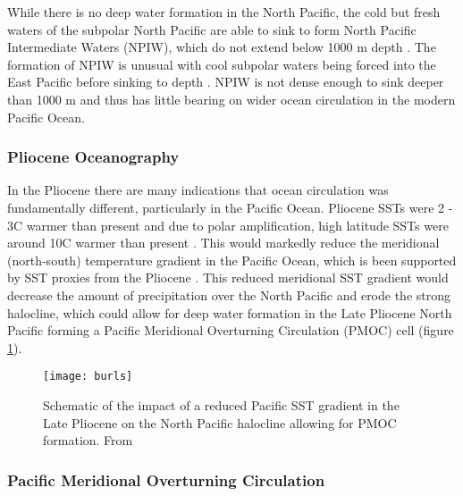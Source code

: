 While there is no deep water formation in the North Pacific, the cold but fresh waters of the subpolar North Pacific are able to sink to form North Pacific Intermediate Waters (NPIW), which do not extend below 1000 m depth \citep{talleyDistributionFormationNorth1993}. The formation of NPIW is unusual with cool subpolar waters being forced into the East Pacific before sinking to depth \citep{youPathwayCirculationNorth2003}. NPIW is not dense enough to sink deeper than 1000 m and thus has little bearing on wider ocean circulation in the modern Pacific Ocean.


\subsubsection{Pliocene Oceanography}

In the Pliocene there are many indications that ocean circulation was fundamentally different, particularly in the Pacific Ocean. Pliocene SSTs were 2 - 3\textdegree C warmer than present and due to polar amplification, high latitude SSTs were around 10\textdegree C warmer than present \citep{wilsonPlioPleistoceneReconstructionEast2011}. This would markedly reduce the meridional (north-south) temperature gradient in the Pacific Ocean, which is been supported by SST proxies from the Pliocene \citep{fedorovTightlyLinkedZonal2015}. This reduced meridional SST gradient would decrease the amount of precipitation over the North Pacific and erode the strong halocline, which could allow for deep water formation in the Late Pliocene North Pacific \citep{burlsActivePacificMeridional2017} forming a Pacific Meridional Overturning Circulation (PMOC) cell (figure \ref{fig:burls}).

\begin{figure}[h]
    \centering
    \texttt{[image: burls]}
    \caption{Schematic of the impact of a reduced Pacific SST gradient in the Late Pliocene on the North Pacific halocline allowing for PMOC formation. From \citet{burlsActivePacificMeridional2017}}
    \label{fig:burls}
\end{figure}

\subsubsection{Pacific Meridional Overturning Circulation}

